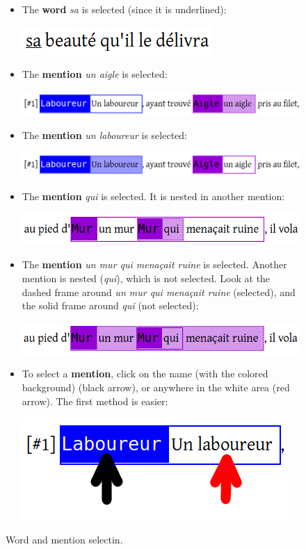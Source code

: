 \documentclass[12pt]{article}
\begin{document}
\begin{figure}
\begin{mdframed}
\begin{itemize}
   \item The \textbf{word} \emph{sa} is selected (since it is underlined):\par
   \includegraphics[scale=0.5]{imgs/sa_selected.png}
   \item The \textbf{mention} \emph{un aigle} is selected:\par
   \includegraphics[scale=0.5]{imgs/aigle_selected.png}
   \item The \textbf{mention} \emph{un laboureur} is selected:\par
   \includegraphics[scale=0.5]{imgs/laboureur_selected.png}
   \item The \textbf{mention} \emph{qui} is selected.  It is nested in
   another mention:\par
   \includegraphics[scale=0.5]{imgs/qui_selected.png}
   \item The \textbf{mention} \emph{un mur qui menaçait ruine} is selected.
   Another mention is nested (\emph{qui}), which is not selected.  Look at
   the dashed frame around \emph{un mur qui menaçait ruine} (selected), and
   the solid frame around \emph{qui} (not selected):\par
   \includegraphics[scale=0.5]{imgs/un_mur_selected.png}
   \item To select a \textbf{mention}, click on the name (with the colored
   background) (black arrow), or anywhere in the white area (red arrow).  The
   first method is easier:\par
   \includegraphics[scale=0.5]{imgs/select_refex.png}
\end{itemize}
\end{mdframed}
\caption{Word and mention selectin.}\label{fig:select-expr}
\end{figure}
\end{document}

